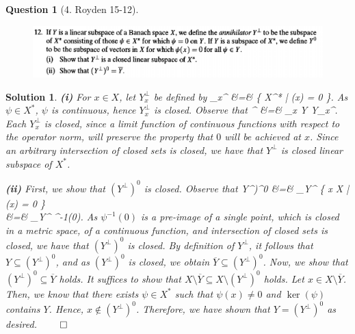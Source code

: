 \documentclass{article} %
\def\eQb#1\eQe{\begin{eqnarray*}#1\end{eqnarray*}}
\theoremstyle{quest}
\newtheorem*{question}{Question}
\newtheorem*{solution}{Solution}
\begin{document}
\begin{question}[4. Royden 15-12]
\hfill
\begin{figure}[h!]
  \centering
    \includegraphics[width=1\textwidth]{15-12.png}
\end{figure}
\end{question}
\begin{solution}
\textbf{(i)} For $x \in X$, let $Y_{x}^{\perp}$ be defined by
\eQb
Y_{x}^{\perp} &=& \{ \psi \in X^* \> | \> \psi(x) = 0 \}.
\eQe
As $\psi \in X^*$, $\psi$ is continuous, hence $Y_{x}^{\perp}$ is
closed. Observe that
\eQb
Y^{\perp} &=& \bigcap_{x \in Y}  Y_{x}^{\perp}.
\eQe
Each $Y_{x}^{\perp}$ is closed, since a limit function of continuous functions
with respect to the operator norm, will preserve the property that
$0$ will be achieved at $x$.
Since an arbitrary intersection of closed sets is closed, we have that
$Y^{\perp}$ is closed linear subspace of $X^*$.

\bigskip

\textbf{(ii)} First, we show that $(Y^{\perp})^0$ is closed. Observe
that 
\eQb
(Y^{\perp})^{0} &=& \bigcap_{\psi \in Y^{\perp}} \{ x \in X \> | \>
\psi(x) = 0 \} \\
&=& \bigcap_{\psi \in Y{^\perp}} \psi^{-1}(0).
\eQe
As $\psi^{-1}(0)$ is a pre-image of a single point, which is closed in 
a metric space, of a continuous function, and intersection of closed sets
is closed, we have that $(Y^{\perp})^{0}$ is closed. By definition of 
$Y^{\perp}$, it follows that $Y \subseteq (Y^{\perp})^0$, and as 
$(Y^{\perp})^0$ is closed, we obtain $\overline{Y} \subseteq (Y^{\perp})^0$.
Now, we show that $(Y^{\perp})^0 \subseteq \overline{Y}$ holds. It suffices
to show that $X\setminus \overline{Y} \subseteq X \setminus 
(Y^{\perp})^0$ holds. 
Let $x \in X\setminus \overline{Y}$. Then, we know that there exists 
$\psi \in X^*$ such that $\psi(x) \neq 0$ and $\ker(\psi)$ contains $Y$.
Hence, $x \notin (Y^{\perp})^{0}$. Therefore, we have shown that
$Y = (Y^{\perp})^0$ as desired. \hfill $\qed$
 
\end{solution}
\end{document}
